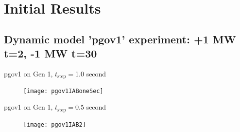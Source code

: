 \documentclass[14pt, unknownkeysallowed]{beamer}
\begin{document}
\section{Initial Results}
\subsection{Dynamic model 'pgov1' experiment: +1 MW t=2, -1 MW t=30}
\begin{frame}
pgov1 on Gen 1, $t_\text{step}=$1.0 second
\begin{figure}
	\texttt{[image: pgov1IABoneSec]}%
\end{figure}
\end{frame}
\begin{frame}
pgov1 on Gen 1, $t_\text{step}=$0.5 second
\begin{figure}
\texttt{[image: pgov1IAB2]}%
\end{figure}
\end{frame}
\end{document}
